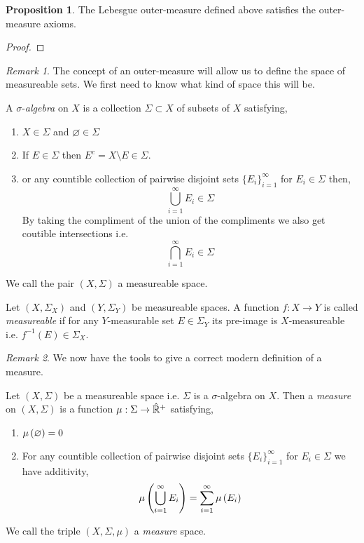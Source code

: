 \documentclass{article}
\newenvironment{definition}[1][Definition:]{\begin{trivlist}
\item[\hskip \labelsep {\bfseries #1}]}{\end{trivlist}}
\theoremstyle{theorem}
\theoremstyle{definition}
\theoremstyle{definition}
\newtheorem*{proposition}{Proposition}
\theoremstyle{remark}
\theoremstyle{definition}
\theoremstyle{remark}
\newtheorem{remark}{Remark}[subsection]
\begin{document}
\begin{proposition}
The Lebesgue outer-measure defined above satisfies the outer-measure axioms.
\end{proposition}

\begin{proof}

\end{proof}

\begin{remark}
The concept of an outer-measure will allow us to define the space of measureable sets. We first need to know what kind of space this will be.
\end{remark}

\begin{definition}
A $\sigma$-\textit{algebra} on $X$ is a collection $\Sigma \subset X$ of subsets of $X$ satisfying,
\begin{enumerate}
\item $X \in \Sigma$ and $\varnothing \in \Sigma$
\item If $E \in \Sigma$ then $E^c = X \setminus E \in \Sigma$.
\item or any countible collection of pairwise disjoint sets $\{ E_i \}_{i = 1}^{\infty}$ for $E_i \in \Sigma$ then,
\[ \bigcup_{i = 1}^\infty E_i \in \Sigma \] 
By taking the compliment of the union of the compliments we also get coutible intersections i.e.
\[ \bigcap_{i = 1}^\infty E_i \in \Sigma \] 
\end{enumerate}
We call the pair $(X, \Sigma)$ a measureable space. 
\end{definition}

\begin{definition}
Let $(X, \Sigma_X)$ and $(Y, \Sigma_Y)$ be measureable spaces. A function $f : X \to Y$ is called \textit{measureable} if for any $Y$-measurable set $E \in \Sigma_Y$ its pre-image is $X$-measureable i.e. $f^{-1}(E) \in \Sigma_X$. 
\end{definition}

\begin{remark}
We now have the tools to give a correct modern definition of a measure.
\end{remark}

\begin{definition}
Let $(X, \Sigma)$ be a measureable space i.e. $\Sigma$ is a $\sigma$-algebra on $X$. Then a \textit{measure} on $(X, \Sigma)$ is a function $\mu : \Sigma \to \hat{\mathbb{R}}^+$ satisfying,
\begin{enumerate}
\item $\mu\left( \varnothing \right) = 0$

\item For any countible collection of pairwise disjoint sets $\{ E_i \}_{i = 1}^{\infty}$ for $E_i \in \Sigma$ we have additivity,
\[ \mu\left( \bigcup_{i = 1}^\infty E_i \right) = \sum_{i = 1}^\infty \mu\left( E_i \right) \]
\end{enumerate}
We call the triple $(X, \Sigma, \mu)$ a \textit{measure} space. 
\end{definition}
\end{document}
